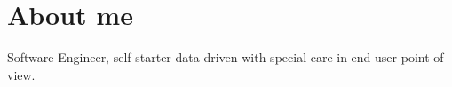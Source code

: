 \documentclass[11pt,a4paper,sans]{moderncv}
\begin{document}
\maketitle

\section{About me}
  \cvitem
    {}
    {Software Engineer, self-starter data-driven with special care in end-user point of view.}{}





\nocite{*}
%
\end{document}
